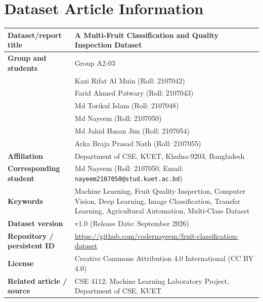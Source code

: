 \documentclass[11pt,a4paper]{article}
\begin{document}
\section{Dataset Article Information}
\noindent
\begin{tabularx}{\textwidth}{p{4.2cm}X}
\hline
\textbf{Dataset/report title} & A Multi-Fruit Classification and Quality Inspection Dataset \\
\hline
\textbf{Group and students} & Group A2-03 \\
 & Kazi Rifat Al Muin (Roll: 2107042) \\
 & Farid Ahmed Patwary (Roll: 2107043) \\
 & Md Torikul Islam (Roll: 2107048) \\
 & Md Nayeem (Roll: 2107050) \\
 & Md Jahid Hasan Jim (Roll: 2107054) \\
 & Arka Braja Prasad Nath (Roll: 2107055) \\
\hline
\textbf{Affiliation} & Department of CSE, KUET, Khulna-9203, Bangladesh \\
\hline
\textbf{Corresponding student} & Md Nayeem (Roll: 2107050, Email: \texttt{nayeem2107050@stud.kuet.ac.bd}) \\
\hline
\textbf{Keywords} & Machine Learning, Fruit Quality Inspection, Computer Vision, Deep Learning, Image Classification, Transfer Learning, Agricultural Automation, Multi-Class Dataset \\
\hline
\textbf{Dataset version} & v1.0 (Release Date: September 2026) \\
\hline
\textbf{Repository / persistent ID} & \url{https://github.com/codernayeem/fruit-classification-dataset} \\
\hline
\textbf{License} & Creative Commons Attribution 4.0 International (CC BY 4.0) \\
\hline
\textbf{Related article / source} & CSE 4112: Machine Learning Laboratory Project, Department of CSE, KUET \\
\hline
\end{tabularx}
\label{tab:dataset-info}

\end{document}
